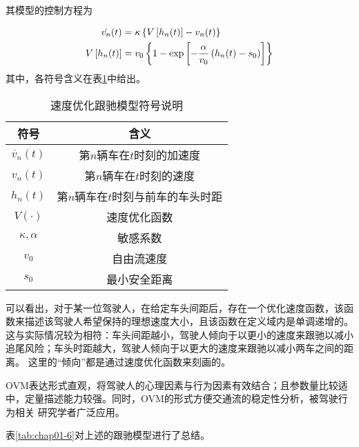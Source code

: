 其模型的控制方程为

\begin{align}
  \dot{v_n}(t) &= \kappa \left\{ V \left[ h_n(t) \right] - v_n(t) \right\} \notag \\
  V \left[ h_n(t) \right] &= v_0 \left\{ 1 - \exp \left[ - \frac{\alpha}{v_0}\left(h_n(t)-s_0\right) \right] \right\}
  \label{eq:chap01-4}
\end{align}
其中，各符号含义在表\ref{tab:chap01-5}中给出。

\begin{table}
  \centering
  \caption{速度优化跟驰模型符号说明}
  \begin{tabular}{cc}
    \toprule
    符号          &  含义                         \\
    \midrule
    $\dot{v_n}(t)$    & 第$n$辆车在$t$时刻的加速度        \\
    $v_n(t)$          & 第$n$辆车在$t$时刻的速度         \\
    $h_n(t)$          & 第$n$辆车在$t$时刻与前车的车头时距  \\
    $V(\cdot)$        & 速度优化函数         \\
    $\kappa, \alpha$  & 敏感系数             \\
    $v_0$             & 自由流速度           \\
    $s_0$             & 最小安全距离        \\
    \bottomrule
  \end{tabular}
  \label{tab:chap01-5}
\end{table}

可以看出，对于某一位驾驶人，在给定车头间距后，存在一个优化速度函数，该函数来描述该驾驶人希望保持的理想速度大小，且该函数在定义域内是单调递增的。
这与实际情况较为相符：车头间距越小，驾驶人倾向于以更小的速度来跟驰以减小追尾风险；车头时距越大，驾驶人倾向于以更大的速度来跟驰以减小两车之间的距离。
这里的“倾向”都是通过速度优化函数来刻画的。

OVM表达形式直观，将驾驶人的心理因素与行为因素有效结合；且参数量比较适中，定量描述能力较强。同时，OVM的形式方便交通流的稳定性分析，被驾驶行为相关
研究学者广泛应用。

表\ref{tab:chap01-6}对上述的跟驰模型进行了总结。

